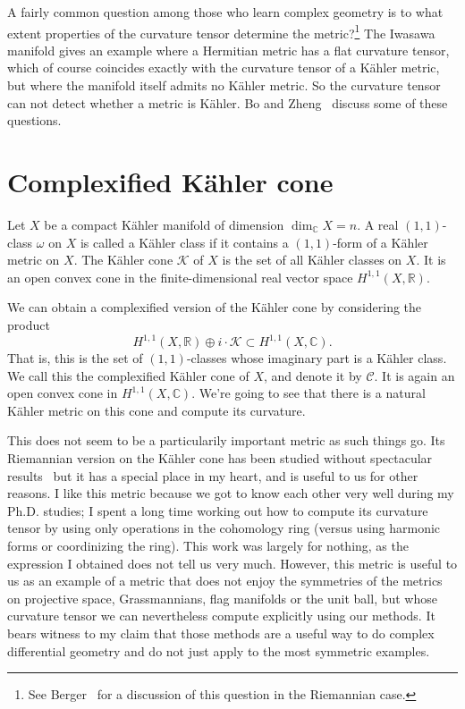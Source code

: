 \documentclass[10pt,a4paper]{article}
\newcommand{\kk}[1]{\mathbb{#1}}
\newcommand{\cc}[1]{\mathcal{#1}}
\begin{document}
A fairly common question among those who learn complex geometry is to what extent properties of the curvature tensor determine the metric?\footnote{See Berger~\cite[Section~4.5]{berger} for a discussion of this question in the Riemannian case.} The Iwasawa manifold gives an example where a Hermitian metric has a flat curvature tensor, which of course coincides exactly with the curvature tensor of a K\"ahler metric, but where the manifold itself admits no K\"ahler metric. So the curvature tensor can not detect whether a metric is K\"ahler. Bo and Zheng~\cite{yang2016curvature} discuss some of these questions.



\section{Complexified K\"ahler cone}
\label{sec:complexified-kahler-cone}


Let $X$ be a compact K\"ahler manifold of dimension $\dim_{\kk C} X = n$.
A real $(1,1)$-class $\omega$ on $X$ is called a K\"ahler class if it contains a $(1,1)$-form of a K\"ahler metric on $X$.
The K\"ahler cone $\cc K$ of $X$ is the set of all K\"ahler classes on $X$. It is an open convex cone in the finite-dimensional real vector space $H^{1,1}(X,\kk R)$.

We can obtain a complexified version of the K\"ahler cone by considering the product
\[
H^{1,1}(X, \kk R) \oplus i \cdot \cc K \subset H^{1,1}(X,\kk C).
\]
That is, this is the set of $(1,1)$-classes whose imaginary part is a K\"ahler class. We call this the complexified K\"ahler cone of $X$, and denote it by $\cc C$. It is again an open convex cone in $H^{1,1}(X,\kk C)$. We're going to see that there is a natural K\"ahler metric on this cone and compute its curvature.

This does not seem to be a particularily important metric as such things go. Its Riemannian version on the K\"ahler cone has been studied without spectacular results~\cite{magnusson2020cohomological,trenner2011asymptotic,wilson2004sectional} but it has a special place in my heart, and is useful to us for other reasons. I like this metric because we got to know each other very well during my Ph.D. studies; I spent a long time working out how to compute its curvature tensor by using only operations in the cohomology ring (versus using harmonic forms or coordinizing the ring). This work was largely for nothing, as the expression I obtained does not tell us very much. However, this metric is useful to us as an example of a metric that does not enjoy the symmetries of the metrics on projective space, Grassmannians, flag manifolds or the unit ball, but whose curvature tensor we can nevertheless compute explicitly using our methods. It bears witness to my claim that those methods are a useful way to do complex differential geometry and do not just apply to the most symmetric examples.
\end{document}

